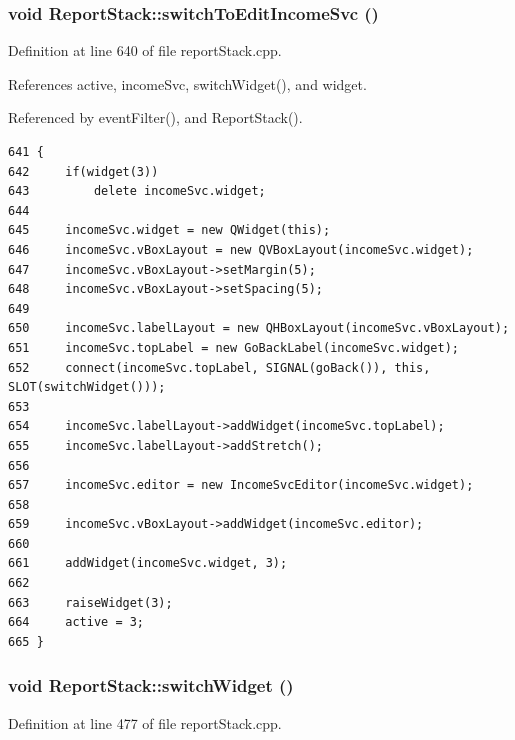\hypertarget{classReportStack_k15}{
\subsubsection[switchToEditIncomeSvc]{\setlength{\rightskip}{0pt plus 5cm}void Report\-Stack::switch\-To\-Edit\-Income\-Svc ()}}
\label{classReportStack_k15}


Definition at line 640 of file report\-Stack.cpp.

References active, income\-Svc, switch\-Widget(), and widget.

Referenced by event\-Filter(), and Report\-Stack().

\footnotesize\begin{verbatim}641 {
642     if(widget(3))
643         delete incomeSvc.widget;
644 
645     incomeSvc.widget = new QWidget(this);
646     incomeSvc.vBoxLayout = new QVBoxLayout(incomeSvc.widget);
647     incomeSvc.vBoxLayout->setMargin(5);
648     incomeSvc.vBoxLayout->setSpacing(5);
649     
650     incomeSvc.labelLayout = new QHBoxLayout(incomeSvc.vBoxLayout);
651     incomeSvc.topLabel = new GoBackLabel(incomeSvc.widget);
652     connect(incomeSvc.topLabel, SIGNAL(goBack()), this, SLOT(switchWidget()));
653     
654     incomeSvc.labelLayout->addWidget(incomeSvc.topLabel);
655     incomeSvc.labelLayout->addStretch();
656     
657     incomeSvc.editor = new IncomeSvcEditor(incomeSvc.widget);
658     
659     incomeSvc.vBoxLayout->addWidget(incomeSvc.editor);
660     
661     addWidget(incomeSvc.widget, 3);
662 
663     raiseWidget(3);
664     active = 3;
665 }
\end{verbatim}\normalsize 


\hypertarget{classReportStack_k7}{
\subsubsection[switchWidget]{\setlength{\rightskip}{0pt plus 5cm}void Report\-Stack::switch\-Widget ()}}
\label{classReportStack_k7}


Definition at line 477 of file report\-Stack.cpp.

